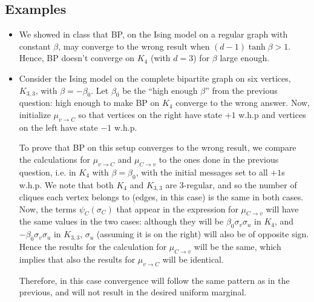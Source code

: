 \documentclass[11pt]{article} \usepackage{amssymb}
\begin{document}
\subsection{Examples}
\begin{itemize}
\item We showed in class that BP, on the Ising model on a regular
  graph with constant $\beta$, may converge to the wrong result when
  $(d-1)\tanh \beta>1$. Hence, BP doesn't converge on $K_4$ (with
  $d=3$) for $\beta$ large enough.
\item Consider the Ising model on the complete bipartite graph on six
  vertices, $K_{3,3}$, with $\beta=-\beta_0$. Let $\beta_0$ be the
  ``high enough $\beta$'' from the previous question: high enough to
  make BP on $K_4$ converge to the wrong answer. Now, initialize
  $\mu_{v\to C}$ so that vertices on the right have state 
  $+1$ w.h.p and vertices on the left have state $-1$ w.h.p.

  To prove that BP on this setup converges to the wrong result, we
  compare the calculations for $\mu_{v\to C}$ and $\mu_{C\to v}$ to
  the ones done in the previous question, i.e. in $K_4$ with
  $\beta=\beta_0$, with the initial messages set to all $+1$s w.h.p.
  We note that both $K_4$ and $K_{3,3}$ are 3-regular, and so the
  number of cliques each vertex belongs to (edges, in this case) is
  the same in both cases. Now, the terms $\psi_C(\sigma_C)$ that
  appear in the expression for $\mu_{C\to v}$ will have the same
  values in the two cases: although they will be
  $\beta_0\sigma_v\sigma_u$ in $K_4$, and $-\beta_0\sigma_v\sigma_u$
  in $K_{3,3}$, $\sigma_u$ (assuming it is on the right) will also be
  of opposite sign. Hence the results for the calculation for
  $\mu_{C\to v}$ will be the same, which implies that also the results
  for $\mu_{v\to C}$ will be identical.

  Therefore, in this case convergence will follow the same pattern as
  in the previous, and will not result in the desired uniform
  marginal.
\end{itemize}
\end{document}

